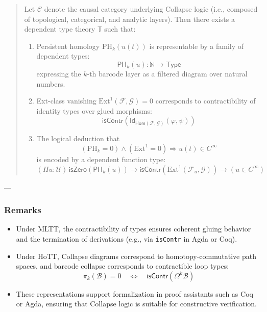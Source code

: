 \documentclass[11pt]{article}
\begin{document}
\begin{axiom}
\begin{axiom}
{{\begin{quote}
Let \( \mathcal{C} \) denote the causal category underlying Collapse logic  
(i.e., composed of topological, categorical, and analytic layers).  
Then there exists a dependent type theory \( \mathbb{T} \) such that:
\begin{enumerate}
  \item Persistent homology \( \mathrm{PH}_k(u(t)) \) is representable by a family of dependent types:  
  \[
  \mathsf{PH}_k(u) : \mathbb{N} \to \mathsf{Type}
  \]
  expressing the \(k\)-th barcode layer as a filtered diagram over natural numbers.

  \item Ext-class vanishing \( \mathrm{Ext}^1(\mathcal{F}, \mathcal{G}) = 0 \) corresponds to contractibility of identity types over glued morphisms:  
  \[
  \mathsf{isContr}\left( \mathsf{Id}_{\mathsf{Hom}(\mathcal{F}, \mathcal{G})}(\varphi, \psi) \right)
  \]

  \item The logical deduction that  
  \[
  (\mathrm{PH}_k = 0) \wedge (\mathrm{Ext}^1 = 0) \Rightarrow u(t) \in C^\infty
  \]
  is encoded by a dependent function type:
  \[
  (\Pi u : \mathcal{U})\, \mathsf{isZero}(\mathsf{PH}_k(u)) \to \mathsf{isContr}(\mathrm{Ext}^1(\mathcal{F}_u, \mathcal{G})) \to (u \in C^\infty)
  \]
\end{enumerate}
\end{quote}

---

\subsubsection*{Remarks}

\begin{itemize}
  \item Under MLTT, the contractibility of types ensures coherent gluing behavior and the termination of derivations  
  (e.g., via \texttt{isContr} in Agda or Coq).

  \item Under HoTT, Collapse diagrams correspond to homotopy-commutative path spaces,  
  and barcode collapse corresponds to contractible loop types:  
  \[
  \pi_k(\mathcal{B}) = 0 \quad \Leftrightarrow \quad \mathsf{isContr}(\Omega^k \mathcal{B})
  \]

  \item These representations support formalization in proof assistants such as Coq or Agda,  
  ensuring that Collapse logic is suitable for constructive verification.


\end{itemize}}}
\end{axiom}
\end{axiom}
\end{document}
